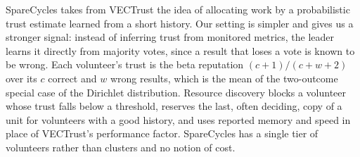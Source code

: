 SpareCycles takes from VECTrust the idea of allocating work by a probabilistic trust estimate learned from a short history. Our setting is simpler and gives us a stronger signal: instead of inferring trust from monitored metrics, the leader learns it directly from majority votes, since a result that loses a vote is known to be wrong. Each volunteer's trust is the beta reputation $(c+1)/(c+w+2)$ over its $c$ correct and $w$ wrong results, which is the mean of the two-outcome special case of the Dirichlet distribution. Resource discovery blocks a volunteer whose trust falls below a threshold, reserves the last, often deciding, copy of a unit for volunteers with a good history, and uses reported memory and speed in place of VECTrust's performance factor. SpareCycles has a single tier of volunteers rather than clusters and no notion of cost.
